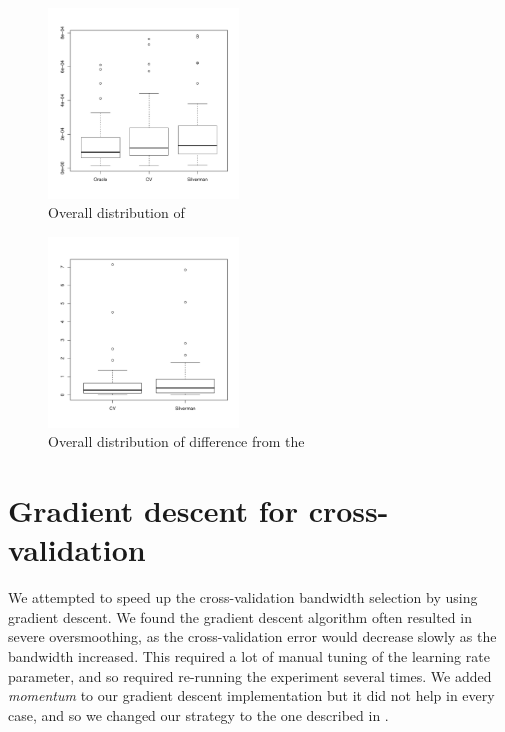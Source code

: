 \begin{figure}[htbp]
  \centering
  \includegraphics[width=0.45\textwidth]{results/by_overall/normalized-sup-error-boxplot}
  \caption{Overall distribution of }
  \label{fig:discussion:overall_nsup_boxplot}
\end{figure}

\begin{figure}[htbp]
  \centering
  \includegraphics[width=0.45\textwidth]{results/by_overall/normalized-mise-diff-boxplot}
  \caption{Overall distribution of  difference from the }
  \label{fig:discussion:overall_nmise_diff_boxplot}
\end{figure}


\section{Gradient descent for cross-validation}
\label{sec:discussion:gradient_descent}

We attempted to speed up the cross-validation bandwidth selection by using gradient descent.
We found the gradient descent algorithm often resulted in severe oversmoothing,
as the cross-validation error would decrease slowly as the bandwidth increased.
This required a lot of manual tuning of the learning rate parameter, and so required re-running the experiment several times.
We added \textit{momentum} to our gradient descent implementation but it did not help in every case, and so we changed our strategy to the one described in .

